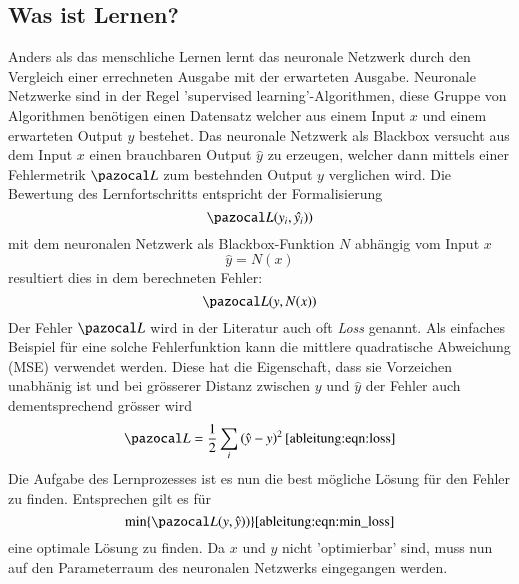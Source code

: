 \subsection{Was ist Lernen?}
Anders als das menschliche Lernen lernt das neuronale Netzwerk durch den Vergleich einer errechneten Ausgabe mit der erwarteten Ausgabe.
Neuronale Netzwerke sind in der Regel 'supervised learning'-Algorithmen, diese Gruppe von Algorithmen benötigen einen Datensatz welcher aus einem Input $x$ und einem erwarteten Output $y$ bestehet.
Das neuronale Netzwerk als Blackbox versucht aus dem Input $x$ einen brauchbaren Output $\hat{y}$ zu erzeugen, welcher dann mittels einer Fehlermetrik $\Lb$ zum bestehnden Output $y$ verglichen wird.
Die Bewertung des Lernfortschritts entspricht der Formalisierung
\begin{equation}
	\Lb(y_{i},\hat{y_i}))
\end{equation}
mit dem neuronalen Netzwerk als Blackbox-Funktion $N$ abhängig vom Input $x$
\begin{equation}
\hat{y} = N(x)
\end{equation}
resultiert dies in dem berechneten Fehler:
\begin{equation}
\Lb(y,N(x))
\end{equation}
Der Fehler $\Lb$ wird in der Literatur auch oft \textit{Loss} genannt.
Als einfaches Beispiel für eine solche Fehlerfunktion kann die mittlere quadratische Abweichung (MSE) verwendet werden. Diese hat die Eigenschaft, dass sie Vorzeichen unabhänig ist und bei grösserer Distanz zwischen $y$ und $\hat{y}$ der Fehler auch dementsprechend grösser wird
\begin{equation}
\Lb = \frac{1}{2} \sum_i \left( \hat{y} - y \right)^2
\ref{ableitung:eqn:loss}
\end{equation}
Die Aufgabe des Lernprozesses ist es nun die best mögliche Lösung für den Fehler zu finden. Entsprechen gilt es für
\begin{equation}
	\min \{ \Lb(y,\hat{y})) \}
	\ref{ableitung:eqn:min_loss}
\end{equation}
eine optimale Lösung zu finden. Da $x$ und $y$ nicht 'optimierbar' sind, muss nun auf den Parameterraum des neuronalen Netzwerks eingegangen werden.

